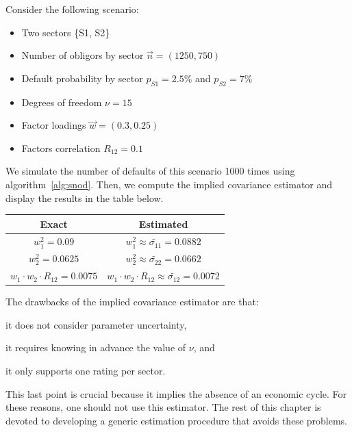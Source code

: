 \documentclass[11pt,fleqn]{book} %
\begin{document}
\begin{example}
	Consider the following scenario:
	\begin{itemize}
		\item Two sectors \{S1, S2\}
		\item Number of obligors by sector $\vec{n} = (1250, 750)$
		\item Default probability by sector $p_{S1} = 2.5\%$ and $p_{S2} = 7\%$
		\item Degrees of freedom $\nu = 15$
		\item Factor loadings $\vec{w} = (0.3, 0.25)$
		\item Factors correlation $R_{12} = 0.1$
	\end{itemize}
	We simulate the number of defaults of this scenario \num{1000} times using 
	algorithm~\ref{alg:snod}. Then, we compute the implied covariance estimator 
	and display the results in the table below.

	\hspace*{1cm}
	\begin{tabular}{|c|c|}
		\hline
		Exact & Estimated \\
		\hline
		$w_1^2 = 0.09$ & $w_1^2 \approx \widetilde{\sigma_{11}} = 0.0882$ \\
		\hline
		$w_2^2 = 0.0625$ & $w_2^2 \approx \widetilde{\sigma_{22}} = 0.0662$ \\
		\hline
		$w_1 \cdot w_2 \cdot R_{12} = 0.0075$ & $w_1 \cdot w_2 \cdot R_{12} \approx \widetilde{\sigma_{12}} = 0.0072$ \\
		\hline
	\end{tabular}
\end{example}

The drawbacks of the implied covariance estimator are that:
\begin{inparaenum}[1)]
	\item it does not consider parameter uncertainty, 
	\item it requires knowing in advance the value of $\nu$, and
	\item it only supports one rating per sector.
\end{inparaenum}
This last point is crucial because it implies the absence of an economic 
cycle. For these reasons, one should not use this estimator. The rest of 
this chapter is devoted to developing a generic estimation procedure that 
avoids these problems.

\end{document}
